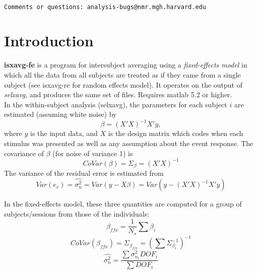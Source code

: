 \documentclass[10pt]{article}
\begin{document}
\begin{Large}
 \\
\end{Large}

\noindent 
\begin{verbatim}
Comments or questions: analysis-bugs@nmr.mgh.harvard.edu
\end{verbatim}

\section{Introduction}
{\bf isxavg-fe} is a program for intersubject averaging using a {\em
fixed-effects model} in which all the data from all subjects are
treated as if they came from a single subject (see isxavg-re for
random effects model).  It operates on the output of {\em selxavg},
and produces the same set of files.  Requires matlab 5.2 or higher.\\

In the within-subject analysis (selxavg), the parameters for each
subject $i$ are estimated (assuming white noise) by
\begin{equation}
\beta = (X'X)^{-1}X'y,
\end{equation}
where $y$ is the input data, and $X$ is the design matrix which codes
when each stimulus was presented as well as any assumption about the
event response. The covariance of $\beta$ (for noise of variance 1) is 
\begin{equation}
CoVar(\beta) = \Sigma_{\beta} = (X'X)^{-1}
\end{equation}
The variance of the residual error is estimated from
\begin{equation}
Var(e_r) = \hat{\sigma_{n}^2} = Var(y-X\beta) = Var(y - (X'X)^{-1}X'y)
\end{equation}

In the fixed-effects model, these three quantities are computed for a
group of subjects/sessions from those of the individuals:
\begin{equation}
\beta_{ffx} = \frac{1}{N_s} \sum \beta_{i}
\end{equation}
\begin{equation}
CoVar(\beta_{ffx}) = \Sigma_{\beta_{ffx}} = (\sum \Sigma_{\beta_i}^{-1})^{-1}
\end{equation}
\begin{equation}
\hat{\sigma_{n}^2} = \frac{\sum{\sigma_{n_i}^2 DOF_i}} 
                          {\sum{DOF_i}}
\end{equation}
\end{document}
